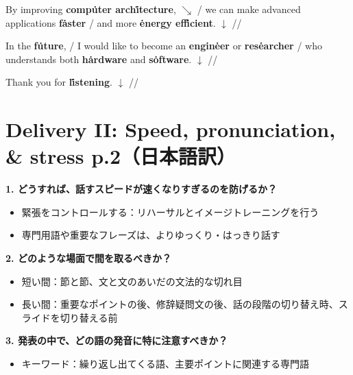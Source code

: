 \documentclass[12pt,a4paper]{ltjsarticle}
\newcommand{\sw}[1]{\textbf{#1}}
\begin{document}
By improving \sw{comp\.{u}ter arch\.{i}tecture}, $\searrow$ / we can make advanced applications \sw{f\.{a}ster} / and more \sw{\.{e}nergy eff\.{i}cient}. $\downarrow$ //

In the \sw{f\.{u}ture}, / I would like to become an \sw{engin\.{e}er} or \sw{res\.{e}archer} / who understands both \sw{h\.{a}rdware} and \sw{s\.{o}ftware}. $\downarrow$ //

Thank you for \sw{l\.{i}stening}. $\downarrow$ //

\section*{Delivery II: Speed, pronunciation, \& stress p.2（日本語訳）}

\textbf{1. どうすれば、話すスピードが速くなりすぎるのを防げるか？}

\begin{itemize}
  \item 緊張をコントロールする：リハーサルとイメージトレーニングを行う
  \item 専門用語や重要なフレーズは、よりゆっくり・はっきり話す
\end{itemize}

\textbf{2. どのような場面で間を取るべきか？}

\begin{itemize}
  \item 短い間：節と節、文と文のあいだの文法的な切れ目
  \item 長い間：重要なポイントの後、修辞疑問文の後、話の段階の切り替え時、スライドを切り替える前
\end{itemize}

\textbf{3. 発表の中で、どの語の発音に特に注意すべきか？}

\begin{itemize}
  \item キーワード：繰り返し出てくる語、主要ポイントに関連する専門語
\end{itemize}
\end{document}
